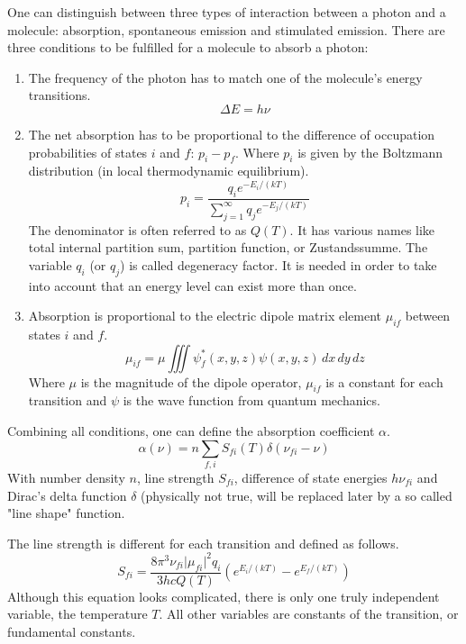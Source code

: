 \documentclass[a4paper,fleqn]{article}
\begin{document}
One can distinguish between three types of interaction between a photon and a
molecule: absorption, spontaneous emission and stimulated emission.  There are
three conditions to be fulfilled for a molecule to absorb a photon:
\begin{enumerate}
\item The frequency of the photon has to match one of the molecule's energy
transitions.
\begin{equation}
  \Delta E = h \nu
\end{equation}

\item The net absorption has to be proportional to the difference of occupation
probabilities of states $i$ and $f$: $p_i - p_f$. Where $p_i$ is given by the
Boltzmann distribution (in local thermodynamic equilibrium).
\begin{equation}
  p_i = \frac{q_i e^{-E_i / (kT)}}
        {\sum_{j=1}^\infty q_j e^{-E_j / (kT)}}
\end{equation}
The denominator is often referred to as $Q(T)$. It has various names like total
internal partition sum, partition function, or Zustandssumme. The variable $q_i$
(or $q_j$) is called degeneracy factor. It is needed in order to take into account
that an energy level can exist more than once.

\item Absorption is proportional to the electric dipole matrix element $\mu_{if}$
between states $i$ and $f$.
\begin{equation}
  \mu_{if} = \mu \iiint \psi_f^*(x,y,z) \psi(x,y,z) \,dx\,dy\,dz
\end{equation}
Where $\mu$ is the magnitude of the dipole operator, $\mu_{if}$ is a constant
for each transition and $\psi$ is the wave function from quantum mechanics.
\end{enumerate}

Combining all conditions, one can define the absorption coefficient $\alpha$.
\begin{equation}
  \alpha(\nu) = n \sum_{f,i} S_{fi}(T) \delta(\nu_{fi} - \nu)
\end{equation}
With number density $n$, line strength $S_{fi}$, difference of state energies
$h\nu_{fi}$ and Dirac's delta function $\delta$ (physically not true, will be
replaced later by a so called "line shape" function.

The line strength is different for each transition and defined as follows.
\begin{equation}
    S_{fi} = \frac{8\pi^3\nu_{fi} \lvert\mu_{fi}\rvert^2 q_i}{3hcQ(T)}
      \left( e^{E_i/(kT)} - e^{E_f/(kT)} \right)
\end{equation}
Although this equation looks complicated, there is only one truly independent
variable, the temperature $T$. All other variables are constants of the
transition, or fundamental constants.
\end{document}
